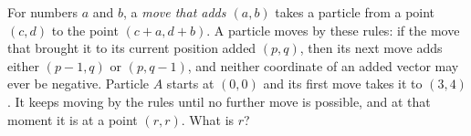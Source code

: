 For numbers $a$ and $b$, a \emph{move that adds $(a,b)$} takes a particle from a point $(c,d)$ to the point $(c+a,d+b)$. A particle moves by these rules: if the move that brought it to its current position added $(p,q)$, then its next move adds either $(p-1,q)$ or $(p,q-1)$, and neither coordinate of an added vector may ever be negative. Particle $A$ starts at $(0,0)$ and its first move takes it to $(3,4)$. It keeps moving by the rules until no further move is possible, and at that moment it is at a point $(r,r)$. What is $r$?
